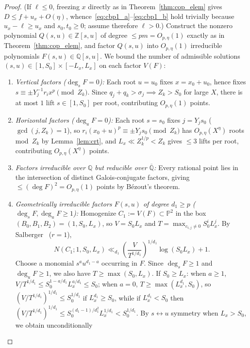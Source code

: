 \documentclass[11pt,a4paper]{amsart}
\theoremstyle{plain}
\theoremstyle{definition}
\theoremstyle{remark}
\newcommand{\Z}{\mathbb{Z}}
\newcommand{\Q}{\mathbb{Q}}
\newcommand{\PP}{\mathbb{P}}
\begin{document}
\begin{proof}
(If $\ell \le 0$, freezing $x$ directly as in Theorem~\ref{thm:cop_elem} gives $D \le f + u_x + O(\eta)$, whence~\eqref{eq:cbp1_a}--\eqref{eq:cbp1_b} hold trivially because $u_x - \ell \ge u_x$ and $s_0, t_0 \ge 0$; assume therefore $\ell > 0$.) Construct the nonzero polynomial $Q(s, u) \in \Z[s, u]$ of degree $\le p m = O_{p,\eta}(1)$ exactly as in Theorem~\ref{thm:cop_elem}, and factor $Q(s, u)$ into $O_{p,\eta}(1)$ irreducible polynomials $F(s, u) \in \Q[s, u]$. We bound the number of admissible solutions $(s, u) \in [1, S_0] \times [-L_x, L_x]$ on each factor $V(F)$:
\begin{enumerate}[label=(\arabic*),itemsep=2pt]
\item \emph{Vertical factors ($\deg_s F = 0$):} Each root $u = u_0$ fixes $x = x_0 + u_0$, hence fixes $s \equiv \pm Y_j^{-1} r_i x^p \pmod{Z_k}$. Since $q_j + q_k > \sigma_j \implies Z_k > S_0$ for large $X$, there is at most $1$ lift $s \in [1, S_0]$ per root, contributing $O_{p,\eta}(1)$ points.
\item \emph{Horizontal factors ($\deg_u F = 0$):} Each root $s = s_0$ fixes $j = Y_j s_0$ ($\gcd(j, Z_k) = 1$), so $r_i(x_0+u)^p \equiv \pm Y_j s_0 \pmod{Z_k}$ has $O_{p,\eta}(X^\eta)$ roots mod~$Z_k$ by Lemma~\ref{lem:crt}, and $L_x \ll Z_k^{1/p} < Z_k$ gives $\le 3$ lifts per root, contributing $O_{p,\eta}(X^\eta)$ points.
\item \emph{Factors irreducible over $\Q$ but reducible over $\overline{\Q}$:} Every rational point lies in the intersection of distinct Galois-conjugate factors, giving $\le (\deg F)^2 = O_{p,\eta}(1)$ points by B\'ezout's theorem.
\item \emph{Geometrically irreducible factors $F(s, u)$ of degree $d_1 \ge p$ ($\deg_s F, \deg_u F \ge 1$):} Homogenize $C_1 := V(F) \subset \PP^2$ in the box $(B_0, B_1, B_2) = (1, S_0, L_x)$, so $V = S_0 L_x$ and $T = \max_{c_{i,j}\neq 0} S_0^i L_x^j$. By Salberger~\cite[Theorem~1.2]{Salberger2023} ($r=1$),
\[
  N(C_1; 1, S_0, L_x) \ll_{d_1} \left(\frac{V}{T^{1/d_1}}\right)^{1/d_1} \log(S_0 L_x) + 1.
\]
Choose a monomial $s^a u^{d_1 - a}$ occurring in $F$. Since $\deg_s F \ge 1$ and $\deg_u F \ge 1$, we also have $T \ge \max(S_0, L_x)$. If $S_0 \ge L_x$: when $a \ge 1$, $V/T^{1/d_1} \le S_0^{1-a/d_1} L_x^{a/d_1} \le S_0$; when $a = 0$, $T \ge \max(L_x^{d_1}, S_0)$, so $(V/T^{1/d_1})^{1/d_1} \le S_0^{1/d_1}$ if $L_x^{d_1} \ge S_0$, while if $L_x^{d_1} < S_0$ then $(V/T^{1/d_1})^{1/d_1} \le S_0^{(d_1-1)/d_1^2} L_x^{1/d_1} < S_0^{1/d_1}$. By $s \leftrightarrow u$ symmetry when $L_x > S_0$, we obtain unconditionally

\end{enumerate}
\end{proof}
\end{document}
